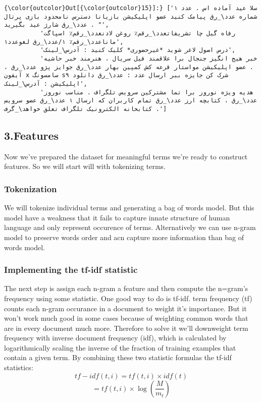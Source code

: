 \documentclass[11pt]{article}
\begin{document}
\begin{Verbatim}[commandchars=\\\{\}]
{\color{outcolor}Out[{\color{outcolor}15}]:} ['سلا عید آماده اس . عدد ۱ شماره عدد\_رق پیامک کنید عضو اپلیکیشن بازیانا دسترس نامحدود بازی پرتال عدد\_رق شارژ عید بگیرید . "',
          'رفاه گیل چا تشریفاتعدد\_رقم٪ روغن لادنعدد\_رقم٪ اسپاگت ماناعدد\_رقم٪ ۱/عدد\_رق لغوعدد۱',
          'درس اصول لاغر شوید *غیرحضوری* کلیک کنید : آدرس\_لینک',
          'خبر هیج انگیز جنجال برا علاقمند فیل سریال ، هنرمند خبر حاشیه . عضو اپلیکیشن مواستار قرعه کش کمپین بهار عدد\_رق جوایز پژو عدد\_رق ، آیفون x سامسونگ s۹ شرک کن جایزه ببر ارسال عدد : عدد\_رق دانلود اپلیکیشن : آدرس\_لینک',
          'هدیه ویژه نوروز برا تما مشترکین سرویس تلگراف . مناسب نوروز عدد\_رق ، کتابچه ارز عدد\_رق تمام کاربران که ارسال ۱ عدد\_رق عضو سرویس کتابخانه الکترونیک تلگراف تعلق خواهد\_گرف .']
\end{Verbatim}
            
    \subsection{3.Features}\label{features}

Now we've prepared the dataset for meaningful terms we're ready to
construct features. So we will start will with tokenizing terms.

    \subsubsection{Tokenization}\label{tokenization}

We will tokenize individual terms and generating a bag of words model.
But this model have a weakness that it fails to capture innate structure
of human language and only represent occurence of terms. Alternatively
we can use n-gram model to preserve words order and acn capture more
information than bag of words model.

    \subsubsection{Implementing the tf-idf
statistic}\label{implementing-the-tf-idf-statistic}

The next step is assign each n-gram a feature and then compute the
n=gram's frequency using some statistic. One good way to do is tf-idf.
term frequency (tf) counts each n-gram occurance in a document to weight
it's importance. But it won't work much good in some cases because of
weighting common words that are in every document much more. Therefore
to solve it we'll downweight term frequency with inverse document
frequency (idf), which is calculated by logarithmically scaling the
inverse of the fraction of training examples that contain a given term.
By combining these two statistic formulas the tf-idf statistics:
\[ tf-idf(t,i) = tf(t,i)\times idf(t) \]
\[ =tf(t,i) \times \log \left( \frac{M}{m_t} \right) \]
\end{document}
